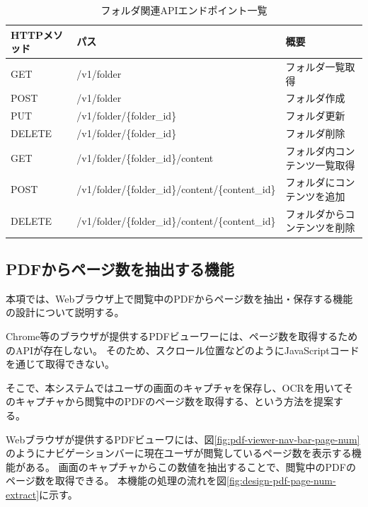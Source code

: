 \begin{table}[htbp]
  \label{tb:design-folder-api}
  \caption{フォルダ関連APIエンドポイント一覧}
  \begin{center}
    \begin{tabular}{|l|l|l|}
      \hline
      HTTPメソッド & パス & 概要 \\\hline\hline
      GET & /v1/folder & フォルダ一覧取得 \\\hline
      POST & /v1/folder & フォルダ作成 \\\hline
      PUT & /v1/folder/\{folder\_id\} & フォルダ更新 \\\hline
      DELETE & /v1/folder/\{folder\_id\} & フォルダ削除 \\\hline
      GET & /v1/folder/\{folder\_id\}/content & フォルダ内コンテンツ一覧取得 \\\hline
      POST & /v1/folder/\{folder\_id\}/content/\{content\_id\} & フォルダにコンテンツを追加 \\\hline
      DELETE & /v1/folder/\{folder\_id\}/content/\{content\_id\} & フォルダからコンテンツを削除 \\\hline
    \end{tabular}
  \end{center}
\end{table}

\subsection{PDFからページ数を抽出する機能}
本項では、Webブラウザ上で閲覧中のPDFからページ数を抽出・保存する機能の設計について説明する。

Chrome等のブラウザが提供するPDFビューワーには、ページ数を取得するためのAPIが存在しない。
そのため、スクロール位置などのようにJavaScriptコードを通じて取得できない。

そこで、本システムではユーザの画面のキャプチャを保存し、OCRを用いてそのキャプチャから閲覧中のPDFのページ数を取得する、という方法を提案する。

Webブラウザが提供するPDFビューワには、図\ref{fig:pdf-viewer-nav-bar-page-num}のようにナビゲーションバーに現在ユーザが閲覧しているページ数を表示する機能がある。
画面のキャプチャからこの数値を抽出することで、閲覧中のPDFのページ数を取得できる。
本機能の処理の流れを図\ref{fig:design-pdf-page-num-extract}に示す。

